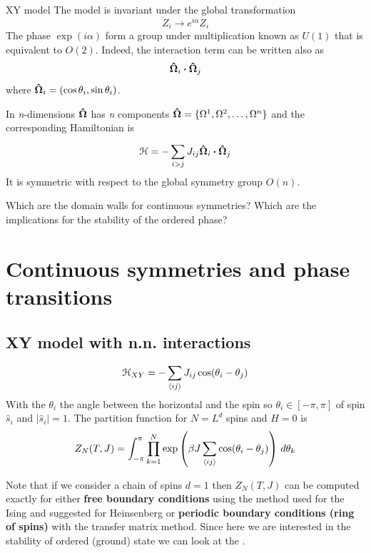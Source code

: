 \documentclass[../../Main/Main.tex]{subfiles}
\begin{document}
\begin{example}{XY model}{}
The model is invariant under the global transformation
\begin{equation}
  Z_i \rightarrow e^{i \alpha } Z_i
\end{equation}
The phase  \( \exp (i \alpha )  \) form a group under multiplication known as \( U(1) \) that is equivalent to \( O(2) \). Indeed, the interaction term can be written also as
\begin{equation*}
  \vu{\Omega }_i \vdot \vu{\Omega }_j
\end{equation*}
where \( \vu{\Omega }_i = ( \cos \theta _i, \sin \theta _i) \).
\begin{remark}
In \emph{n}-dimensions \( \vu{\Omega } \) has \emph{n} components  \( \vu{\Omega } = \{ \Omega ^1, \Omega ^2, \dots, \Omega ^n \}   \)  and the corresponding Hamiltonian is
\begin{equation}
  \mathcal{H} = - \sum_{i>j}^{} J_{ij} \vu{\Omega }_i \vdot  \vu{\Omega }_j
\end{equation}
It is symmetric with respect to the global symmetry group \( O(n) \).
\end{remark}
\end{example}

 Which are the domain walls for continuous symmetries? Which are the implications for the stability of the ordered phase?

\section{Continuous symmetries and phase transitions}
\subsection{XY model with n.n. interactions}
$$\mathcal{H}_{XY} = - \sum_{{\left< {ij} \right>}} J_{ij} \cos(\theta_{i}- \theta_{j})$$
With the $\theta_{i}$ the angle between the horizontal and the spin so $\theta_{i} \in [-\pi,\pi]$ of spin $\hat{s}_{i}$ and $\mid \hat{s}_{i}\mid = 1$.
The partition function for $N = L^{d}$ spins and $H = 0$ is
$$Z_{N}(T,J) = \int_{-\pi}^{\pi} \prod_{k=1}^{N}\exp\left( \beta J \sum_{{\left< ij \right>}} \cos(\theta_{i}-\theta_{j})\right) \, d\theta_{k} $$

Note that if we consider a chain of spins $d = 1$ then $Z_{N}(T,J)$ can be computed exactly for either \textbf{free boundary conditions} using the method used for the Ising and suggested for Heinsenberg or \textbf{periodic boundary conditions (ring of spins)} with the transfer matrix method.
Since here we are interested in the stability of ordered (ground) state we can look at the .
\end{document}
